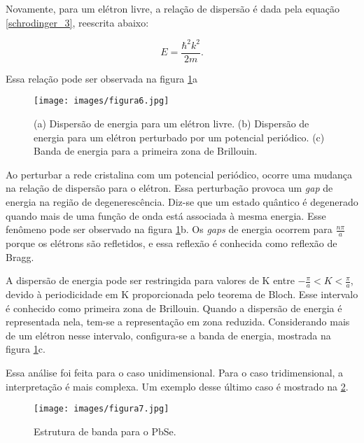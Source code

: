 		\par Novamente, para um elétron livre, a relação de dispersão é dada pela equação \eqref{schrodinger_3}, reescrita abaixo:

		\begin{equation}\label{eq_schrodinger_autovalores_rewrote}
	        E = \frac{\hbar^2 k^2}{2m}.
	  	\end{equation}

	  	\par Essa relação pode ser observada na figura \ref{fig6}a

	  	\begin{figure}[H]
	      \caption{(a) Dispersão de energia para um elétron livre. (b) Dispersão de energia para um elétron perturbado por um potencial periódico. (c) Banda de energia para a primeira zona de Brillouin.\cite{qm_fis0}}
	      \centering
	      \texttt{[image: images/figura6.jpg]}
	      \label{fig6}
	    \end{figure}

	  	\par Ao perturbar a rede cristalina com um potencial periódico, ocorre uma mudança na relação de dispersão para o elétron. Essa perturbação provoca um \textit{gap} de energia na região de degenerescência. Diz-se que um estado quântico é degenerado quando mais de uma função de onda está associada à mesma energia. Esse fenômeno pode ser observado na figura \ref{fig6}b. Os \textit{gaps} de energia ocorrem para $\frac{n\pi}{a}$ porque os elétrons são refletidos, e essa reflexão é conhecida como reflexão de Bragg.

	  	\par A dispersão de energia pode ser restringida para valores de K entre $-\frac{\pi}{a} < K < \frac{\pi}{a}$, devido à periodicidade em K proporcionada pelo teorema de Bloch. Esse intervalo é conhecido como primeira zona de Brillouin. Quando a dispersão de energia é representada nela, tem-se a representação em zona reduzida. Considerando mais de um elétron nesse intervalo, configura-se a banda de energia, mostrada na figura \ref{fig6}c.

		\par Essa análise foi feita para o caso unidimensional. Para o caso tridimensional, a interpretação é mais complexa. Um exemplo desse último caso é mostrado na \ref{fig7}.

		\begin{figure}[H]
	      \caption{Estrutura de banda para o PbSe. \cite{qm_fis0}}
	      \centering
	      \texttt{[image: images/figura7.jpg]}
	      \label{fig7}
	    \end{figure}

